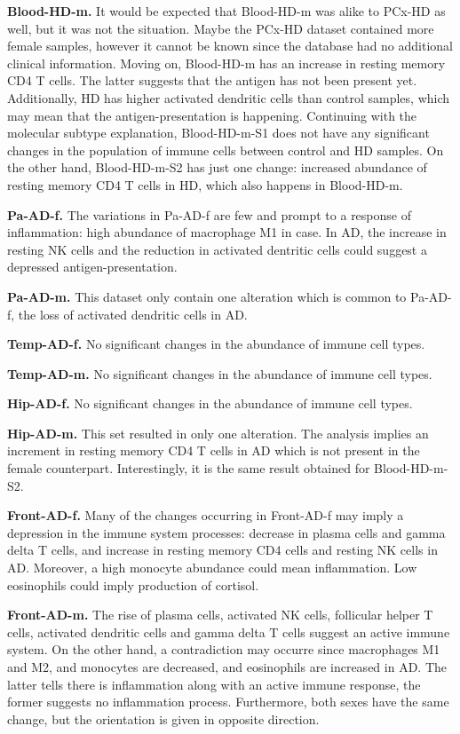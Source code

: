 \textbf{Blood-HD-m.} It would be expected that Blood-HD-m was alike to PCx-HD as well, but it was not the situation. Maybe the PCx-HD dataset contained more female samples, however it cannot be known since the database had no additional clinical information. Moving on, Blood-HD-m has an increase in resting memory CD4 T cells. The latter suggests that the antigen has not been present yet. Additionally, HD has higher activated dendritic cells than control samples, which may mean that the antigen-presentation is happening. 
Continuing with the molecular subtype explanation, Blood-HD-m-S1 does not have any significant changes in the population of immune cells between control and HD samples. On the other hand, Blood-HD-m-S2 has just one change: increased abundance of resting memory CD4 T cells in HD, which also happens in Blood-HD-m.

\textbf{Pa-AD-f.} The variations in Pa-AD-f are few and prompt to a response of inflammation: high abundance of macrophage M1 in case. In AD, the increase in resting NK cells and the reduction in activated dentritic cells could suggest a depressed antigen-presentation.

\textbf{Pa-AD-m.} This dataset only contain one alteration which is common to Pa-AD-f, the loss of activated dendritic cells in AD.

\textbf{Temp-AD-f.} No significant changes in the abundance of immune cell types.

\textbf{Temp-AD-m.} No significant changes in the abundance of immune cell types.

\textbf{Hip-AD-f.} No significant changes in the abundance of immune cell types.

\textbf{Hip-AD-m.} This set resulted in only one alteration. The analysis implies an increment in resting memory CD4 T cells in AD which is not present in the female counterpart. Interestingly, it is the same result obtained for Blood-HD-m-S2.

\textbf{Front-AD-f.} Many of the changes occurring in Front-AD-f may imply a depression in the immune system processes: decrease in plasma cells and gamma delta T cells, and increase in resting memory CD4 cells and resting NK cells in AD. Moreover, a high monocyte abundance could mean inflammation. Low eosinophils could imply production of cortisol.

\textbf{Front-AD-m.} The rise of plasma cells, activated NK cells, follicular helper T cells, activated dendritic cells and gamma delta T cells suggest an active immune system. On the other hand, a contradiction may occurre since macrophages M1 and M2, and monocytes are decreased, and eosinophils are increased in AD. The latter tells there is inflammation along with an active immune response, the former suggests no inflammation process. Furthermore, both sexes have the same change, but the orientation is given in opposite direction.

